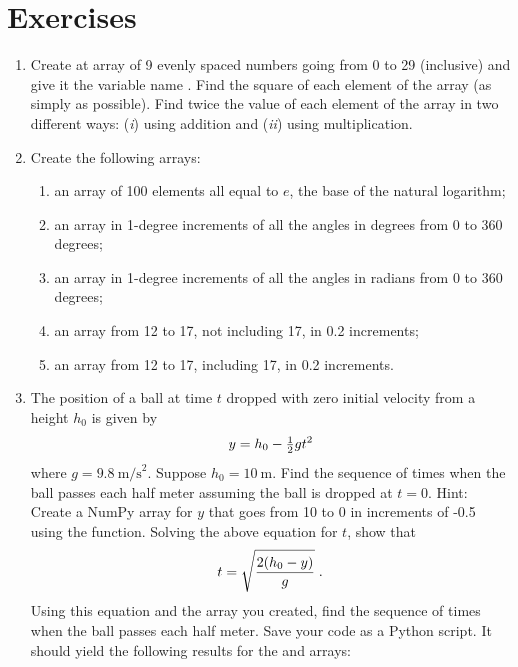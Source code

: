 \documentclass[letterpaper,10pt,english]{sphinxmanual}
\begin{document}
\section{Exercises}
\label{chap3/chap3_arrays:exercises}\begin{enumerate}
\item {} 
Create at array of 9 evenly spaced numbers going from 0 to 29 (inclusive) and give it the variable name .  Find the square of each element of the array (as simply as possible).  Find twice the value of each element of the array in two different ways: (\emph{i}) using addition and (\emph{ii}) using multiplication.

\item {} 
Create the following arrays:
\begin{enumerate}
\item {} 
an array of 100 elements all equal to \(e\), the base of the natural logarithm;

\item {} 
an array in 1-degree increments of all the angles in degrees from 0 to 360 degrees;

\item {} 
an array in 1-degree increments of all the angles in radians from 0 to 360 degrees;

\item {} 
an array from 12 to 17, not including 17, in 0.2 increments;

\item {} 
an array from 12 to 17, including 17, in 0.2 increments.

\end{enumerate}

\item {} 
The position of a ball at time \(t\) dropped with zero initial velocity from a height \(h_0\) is given by
\begin{gather}
\begin{split}y = h_0 - \tfrac{1}{2}gt^2\end{split}\notag
\end{gather}
where \(g=9.8~\mathrm{m/s}^2\).  Suppose \(h_0=10~\mathrm{m}\).  Find the sequence of times when the ball passes each half meter assuming the ball is dropped at \(t=0\).  Hint: Create a NumPy array for \(y\) that goes from 10 to 0 in increments of -0.5 using the  function.  Solving the above equation for \(t\), show that
\begin{gather}
\begin{split}t = \sqrt{\frac{2(h_0-y)}{g}} \;.\end{split}\notag
\end{gather}
Using this equation and the array you created, find the sequence of times when the ball passes each half meter.  Save your code as a Python script.  It should yield the following results for the  and  arrays:


\end{enumerate}
\end{document}
